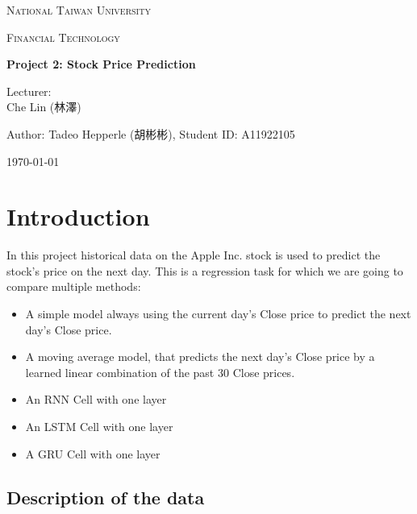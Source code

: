 \documentclass[utf8x]{ctexart}
\begin{document}
\begin{titlepage}
  \centering
  {\scshape\LARGE National Taiwan University \par}
  \vspace{1cm}
  {\scshape\Large Financial Technology \par}
  \vspace{2cm}
  {\huge\bfseries Project 2: Stock Price Prediction \par}
  \vspace{2cm}
  {\Large Lecturer:\\
    Che Lin (林澤) \par}
  \vspace{1cm}
  {\Large Author: Tadeo Hepperle (胡彬彬), Student ID: A11922105 \par}
  \vfill
  {\large \today\par}
\end{titlepage}


\tableofcontents

\cleardoublepage

\section{Introduction}

In this project historical data on the Apple Inc. stock is used to predict the stock's price on the next day. This is a regression task for which we are going to compare multiple methods:
\begin{itemize}
  \item A simple model always using the current day's Close price to predict the next day's Close price.
  \item A moving average model, that predicts the next day's Close price by a learned linear combination of the past 30 Close prices.
  \item An RNN Cell with one layer
  \item An LSTM Cell with one layer
  \item A GRU Cell with one layer
\end{itemize}

\subsection{Description of the data}
\end{document}
